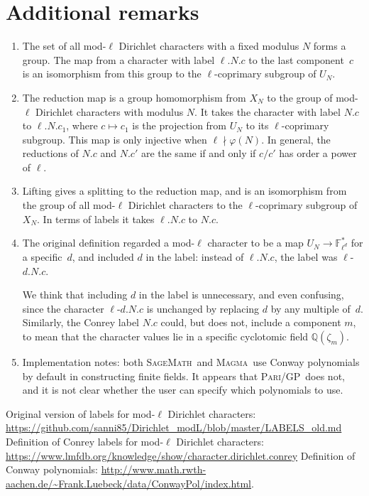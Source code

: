\documentclass[a4paper, 10pt]{amsart}
\def\Q{{\mathbb Q}}
\def\Fld{{\mathbb F}_{\ell^d}}
\newcommand{\software}[1]{\textsc{#1}{}}
\newcommand{\Sage}{\software{SageMath}}
\newcommand{\Magma}{\software{Magma}}
\newcommand{\GP}{\software{Pari/GP}}
\newcommand{\CLab}[2]{$#1.#2$}
\newcommand{\DLab}[3]{$#1.#2.#3$}
\newcommand{\oldDLab}[4]{$#1$-$#2.#3.#4$}
\begin{document}
\section{Additional remarks}
\begin{enumerate}
\item
  The set of all mod-$\ell$ Dirichlet characters with a fixed modulus
  $N$ forms a group.  The map from a character with label
  \DLab{\ell}{N}{c} to the last component~$c$ is an isomorphism from
  this group to the $\ell$-coprimary subgroup of $ U_N$.
\item
  The reduction map is a group homomorphism from $X_N$ to the group
  of mod-$\ell$ Dirichlet characters with modulus $N$.  It takes the
  character with label \CLab{N}{c} to \DLab{\ell}{N}{c_1}, where
  $c\mapsto c_1$ is the projection from $ U_N$ to its $\ell$-coprimary
  subgroup.  This map is only injective when $\ell\nmid\varphi(N)$.
  In general, the reductions of \CLab{N}{c} and \CLab{N}{c'} are the
  same if and only if $c/c'$ has order a power of $\ell$.
\item
  Lifting gives a splitting to the reduction map, and is an
  isomorphism from the group of all mod-$\ell$ Dirichlet characters to
  the $\ell$-coprimary subgroup of $X_N$. In terms of labels it
  takes \DLab{\ell}{N}{c} to \CLab{N}{c}.
\item
  The original definition regarded a mod-$\ell$ character to be a map
  $ U_N\to\Fld^*$ for a specific~$d$, and included $d$ in the label:
  instead of \DLab{\ell}{N}{c}, the label was \oldDLab{\ell}{d}{N}{c}.

  We think that including $d$ in the label is unnecessary, and even
  confusing, since the character \oldDLab{\ell}{d}{N}{c} is unchanged
  by replacing $d$ by any multiple of~$d$.  Similarly, the Conrey
  label \CLab{N}{c} could, but does not, include a component $m$,
  to mean that the character values lie in a specific cyclotomic field
  $\Q(\zeta_m)$.

\item
  Implementation notes: both \Sage\ and \Magma\ use Conway polynomials
  by default in constructing finite fields.  It appears that \GP\ does
  not, and it is not clear whether the user can specify which
  polynomials to use.
\end{enumerate}

\begin{thebibliography}{99}
 Original version of labels for mod-$\ell$ Dirichlet
  characters:
  \url{https://github.com/sanni85/Dirichlet_modL/blob/master/LABELS_old.md}
  Definition of Conrey labels for mod-$\ell$ Dirichlet characters:
  \url{https://www.lmfdb.org/knowledge/show/character.dirichlet.conrey}
 Definition of Conway polynomials:
  \url{http://www.math.rwth-aachen.de/~Frank.Luebeck/data/ConwayPol/index.html}.
\end{thebibliography}
\end{document}
